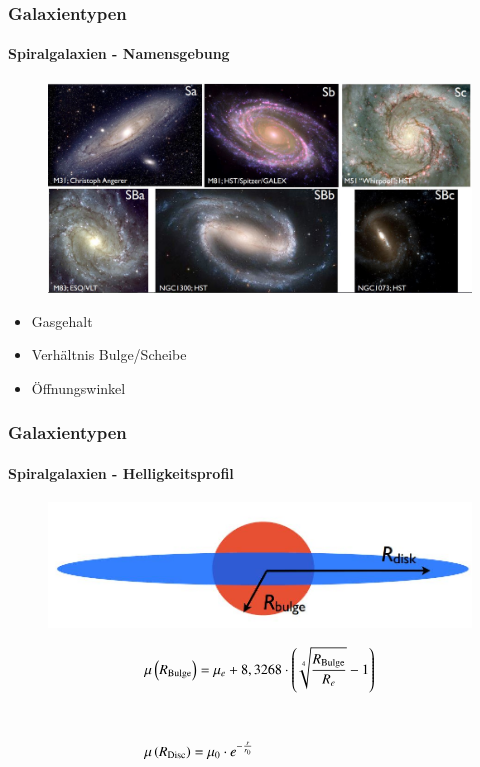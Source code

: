 \begin{frame}
\frametitle{Galaxientypen}
\framesubtitle{Spiralgalaxien - Namensgebung}

\begin{figure}
\includegraphics[scale=0.25]{Spiral_Namensgebung.jpg}
\end{figure}

\begin{itemize}
\item Gasgehalt
\item Verhältnis Bulge/Scheibe
\item Öffnungswinkel
\end{itemize}

\end{frame}


\begin{frame}
\frametitle{Galaxientypen}
\framesubtitle{Spiralgalaxien - Helligkeitsprofil}

\begin{figure}
\includegraphics[scale=0.25]{Spiralgalaxie_Schema.jpg}
\end{figure}

\begin{align*}
&\mu \left( R_{\text{Bulge}} \right) = \mu_e + 8,3268 \cdot \left( \sqrt[4]{\frac{R_{\text{Bulge}}}{R_e}} - 1 \right) \\
\hfill \\
\hfill \\
&\mu \left( R_{\text{Disc}} \right) = \mu_0 \cdot e^{-\frac{r}{r_0}}
\end{align*}

\end{frame}


